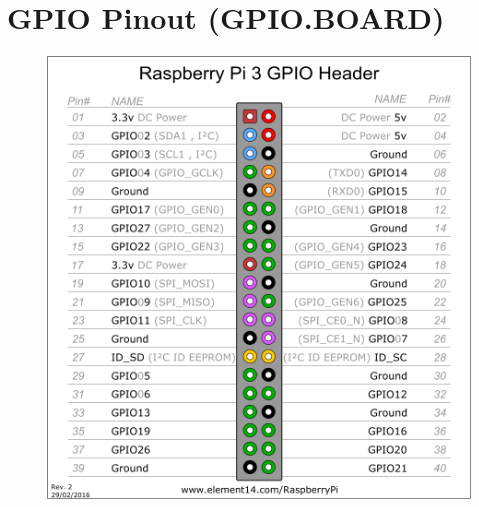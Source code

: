 \section{GPIO Pinout (GPIO.BOARD)}
	\label{sec:pinout}
	\begin{figure}[h]
		\centering
		\includegraphics[width=0.9\linewidth]{sections/a1_GPIO/pinout.png}
		\label{fig:pinout}
	\end{figure}